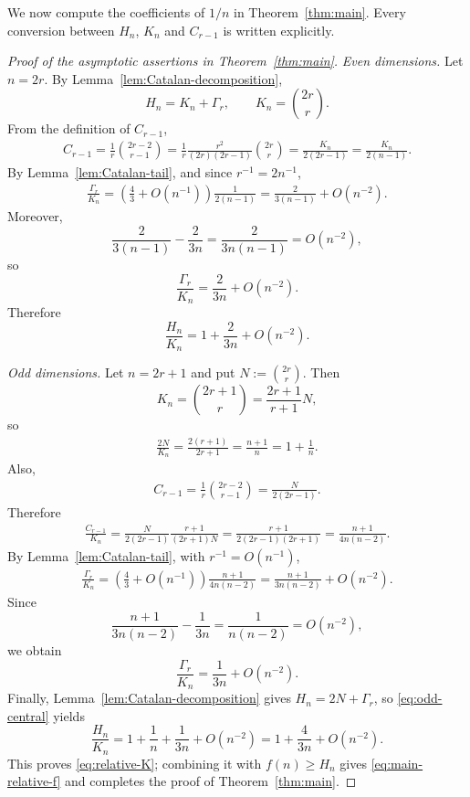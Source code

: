 \documentclass[10pt]{amsart}
\numberwithin{equation}{section}
\begin{document}
We now compute the coefficients of $1/n$ in Theorem~\ref{thm:main}.  Every
conversion between $H_n$, $K_n$ and $C_{r-1}$ is written explicitly.

\begin{proof}[Proof of the asymptotic assertions in Theorem~\ref{thm:main}]
\medskip
\noindent\emph{Even dimensions.}
Let $n=2r$.  By Lemma~\ref{lem:Catalan-decomposition},
\[
 H_n=K_n+\Gamma_r,
 \qquad
 K_n=\binom{2r}{r}.
\]
From the definition of $C_{r-1}$,
\begin{align*}
 C_{r-1}
 =\frac1r\binom{2r-2}{r-1}
 =\frac1r\frac{r^2}{(2r)(2r-1)}\binom{2r}{r}
 =\frac{K_n}{2(2r-1)}
 =\frac{K_n}{2(n-1)}.
\end{align*}
By Lemma~\ref{lem:Catalan-tail}, and since $r^{-1}=2n^{-1}$,
\begin{align*}
 \frac{\Gamma_r}{K_n}
 =\left(\frac43+O(n^{-1})\right)\frac{1}{2(n-1)}
 =\frac{2}{3(n-1)}+O(n^{-2}).
\end{align*}
Moreover,
\[
 \frac{2}{3(n-1)}-\frac{2}{3n}
 =\frac{2}{3n(n-1)}=O(n^{-2}),
\]
so
\[
 \frac{\Gamma_r}{K_n}=\frac{2}{3n}+O(n^{-2}).
\]
Therefore
\[
 \frac{H_n}{K_n}=1+\frac{2}{3n}+O(n^{-2}).
\]

\medskip
\noindent\emph{Odd dimensions.}
Let $n=2r+1$ and put
$
 N:=\binom{2r}{r}.
$
Then
\[
 K_n=\binom{2r+1}{r}=\frac{2r+1}{r+1}N,
\]
so
\begin{align}
 \frac{2N}{K_n}
 =\frac{2(r+1)}{2r+1}
 =\frac{n+1}{n}
 =1+\frac1n.
 \label{eq:odd-central}
\end{align}
Also,
\begin{align*}
 C_{r-1}
 =\frac1r\binom{2r-2}{r-1}
 =\frac{N}{2(2r-1)}.
\end{align*}
Therefore
\begin{align}
 \frac{C_{r-1}}{K_n}
 =\frac{N}{2(2r-1)}\frac{r+1}{(2r+1)N}
 =\frac{r+1}{2(2r-1)(2r+1)}
 =\frac{n+1}{4n(n-2)}.
 \label{eq:odd-Catalan-normalization}
\end{align}
By Lemma~\ref{lem:Catalan-tail}, with $r^{-1}=O(n^{-1})$,
\begin{align*}
 \frac{\Gamma_r}{K_n}
 =\left(\frac43+O(n^{-1})\right)
   \frac{n+1}{4n(n-2)}
 =\frac{n+1}{3n(n-2)}+O(n^{-2}).
\end{align*}
Since
\[
 \frac{n+1}{3n(n-2)}-\frac1{3n}
 =\frac{1}{n(n-2)}=O(n^{-2}),
\]
we obtain
\[
 \frac{\Gamma_r}{K_n}=\frac1{3n}+O(n^{-2}).
\]
Finally, Lemma~\ref{lem:Catalan-decomposition} gives $H_n=2N+\Gamma_r$, so
\cref{eq:odd-central} yields
\[
 \frac{H_n}{K_n}
 =1+\frac1n+\frac1{3n}+O(n^{-2})
 =1+\frac{4}{3n}+O(n^{-2}).
\]
This proves \cref{eq:relative-K}; combining it with $f(n)\ge H_n$ gives
\cref{eq:main-relative-f} and completes the proof of Theorem~\ref{thm:main}.
\end{proof}
\end{document}
